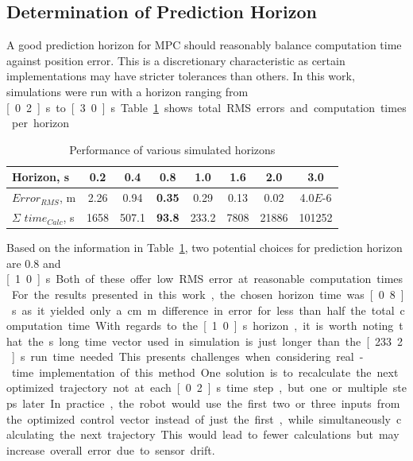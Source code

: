 \documentclass[letterpaper, 10 pt, conferences]{IEEEconf}  %
\begin{document}
\subsection{Determination of Prediction Horizon} \label{results:bestHorizon}

A good prediction horizon for MPC should reasonably balance computation time against position error. This is a discretionary characteristic as certain implementations may have stricter tolerances than others. In this work, simulations were run with a horizon ranging from \unit[0.2]{s} to \unit[3.0]{s}. Table~\ref{table:bestHorizon} shows total RMS errors and computation times per horizon. 

\setlength\tabcolsep{4pt}
\begin{table}[h]
\caption{Performance of various simulated horizons}
\begin{center}
\def\arraystretch{1.2}%
\begin{tabular}{ |l|c|c|c|c|c|c|c| } 
 \hline 
 Horizon, s & 0.2 & 0.4 & \textbf{0.8} & 1.0 & 1.6 & 2.0 & 3.0 \\ 
 \hline
 $Error_{RMS}$, m & 2.26 & 0.94 & \textbf{0.35} & 0.29 & 0.13 & 0.02 & 4.0$E$-6 \\ 
 $\Sigma$ $time_{Calc}$, s & 1658 & 507.1 & \textbf{93.8} & 233.2 & 7808 & 21886 & 101252 \\ 
 \hline
\end{tabular}
\end{center}
\label{table:bestHorizon}
\end{table}
\setlength\tabcolsep{6pt}

Based on the information in Table~\ref{table:bestHorizon}, two potential choices for prediction horizon are 0.8 and \unit[1.0]{s}. Both of these offer low RMS error at reasonable computation times. For the results presented in this work, the chosen horizon time was \unit[0.8]{s} as it yielded only a \unit[6]{cm}m difference in error for less than half the total computation time. 

With regards to the \unit[1.0]{s} horizon, it is worth noting that the \unit[240]{s} long time vector used in simulation is just longer than the \unit[233.2]{s} run time needed. This presents challenges when considering real-time implementation of this method. One solution is to recalculate the next optimized trajectory not at each \unit[0.2]{s} time step, but one or multiple steps later. In practice, the robot would use the first two or three inputs from the optimized control vector instead of just the first, while simultaneously calculating the next trajectory. This would lead to fewer calculations but may increase overall error due to sensor drift. 
\end{document}

